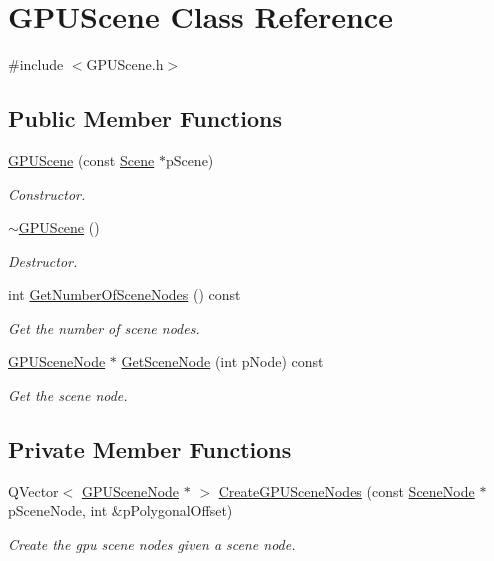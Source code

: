 \hypertarget{class_g_p_u_scene}{\section{G\+P\+U\+Scene Class Reference}
\label{class_g_p_u_scene}
}


{\ttfamily \#include $<$G\+P\+U\+Scene.\+h$>$}

\subsection*{Public Member Functions}
\begin{DoxyCompactItemize}
\item 
\hyperlink{class_g_p_u_scene_a3733fd483825d0c17168f140b0d6cf46}{G\+P\+U\+Scene} (const \hyperlink{class_scene}{Scene} $\ast$p\+Scene)
\begin{DoxyCompactList}\small\item\em Constructor. \end{DoxyCompactList}\item 
\hyperlink{class_g_p_u_scene_aee29d4f5c61c32c117074084b4402526}{$\sim$\+G\+P\+U\+Scene} ()
\begin{DoxyCompactList}\small\item\em Destructor. \end{DoxyCompactList}\item 
int \hyperlink{class_g_p_u_scene_a8ad8c31a74460d3f224b3b62ba0b41b6}{Get\+Number\+Of\+Scene\+Nodes} () const 
\begin{DoxyCompactList}\small\item\em Get the number of scene nodes. \end{DoxyCompactList}\item 
\hyperlink{class_g_p_u_scene_node}{G\+P\+U\+Scene\+Node} $\ast$ \hyperlink{class_g_p_u_scene_a71e3cc6ae949f991c841b834b9d8476e}{Get\+Scene\+Node} (int p\+Node) const 
\begin{DoxyCompactList}\small\item\em Get the scene node. \end{DoxyCompactList}\end{DoxyCompactItemize}
\subsection*{Private Member Functions}
\begin{DoxyCompactItemize}
\item 
Q\+Vector$<$ \hyperlink{class_g_p_u_scene_node}{G\+P\+U\+Scene\+Node} $\ast$ $>$ \hyperlink{class_g_p_u_scene_afda8b3ecd86a2b3401179c6b840440dd}{Create\+G\+P\+U\+Scene\+Nodes} (const \hyperlink{class_scene_node}{Scene\+Node} $\ast$p\+Scene\+Node, int \&p\+Polygonal\+Offset)
\begin{DoxyCompactList}\small\item\em Create the gpu scene nodes given a scene node. \end{DoxyCompactList}\end{DoxyCompactItemize}
